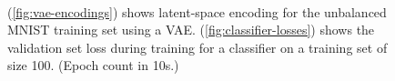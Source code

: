 \documentclass[a4paper]{article}
\begin{document}
\begin{figure}
  \centering
   \\
  \caption{(\ref{fig:vae-encodings}) shows latent-space encoding for the
    unbalanced MNIST training set using a VAE. (\ref{fig:classifier-losses})
    shows the validation set loss during training for a classifier on a training
    set of size 100. (Epoch count in 10s.)}
  \label{fig:unbalanced-mnist-results}
\end{figure}
\end{document}
